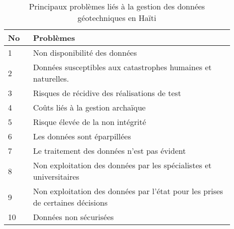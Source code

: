 \par    
\begin{table}
        \centering
        \begin{tabular}{|p{0.10\linewidth}|p{0.80\linewidth}|}
        \hline
                \textbf{No} & \textbf{Problèmes} \\
                \hline
                    1&
                    Non disponibilité des données
                         \\
                \hline
                2&
                Données susceptibles aux catastrophes humaines et naturelles.
                    \\
                \hline
                3&
                Risques de récidive des réalisations de test
                    \\
                \hline
                4&
                Coûts liés à la gestion archaïque
                    \\
                \hline
                5&
                Risque élevée de la non intégrité
                        \\
                \hline
                6&
                Les données sont éparpillées
                        \\
                \hline
                7&
                Le traitement des données n'est pas évident
                        \\
                \hline
                8&
                Non exploitation des données par les spécialistes et universitaires
                        \\
                \hline 
                9&
                Non exploitation des données par l'état pour les prises de certaines décisions
                        \\
                \hline 
                10&
                Données non sécurisées
                        \\
                \hline 
        \end{tabular}
        \caption{Principaux problèmes liés à la gestion des données géotechniques en Haïti} \label{tab:problemes}
\end{table}
\par